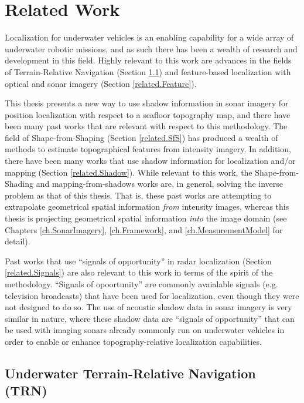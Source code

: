 
\chapter{Related Work}
\label{ch.RelatedWork}

Localization for underwater vehicles is an enabling capability for a wide array of underwater robotic missions, and as such there has been a wealth of research and development in this field.
Highly relevant to this work are advances in the fields of Terrain-Relative Navigation (Section \ref{related.TRN}) and feature-based localization with optical and sonar imagery (Section \ref{related.Feature}).

This thesis presents a new way to use shadow information in sonar imagery for position localization with respect to a seafloor topography map, and there have been many past works that are relevant with respect to this methodology.
The field of Shape-from-Shaping (Section \ref{related.SfS}) has produced a wealth of methods to estimate topographical features from intensity imagery.
In addition, there have been many works that use shadow information for localization and/or mapping (Section \ref{related.Shadow}).
While relevant to this work, the Shape-from-Shading and mapping-from-shadows works are, in general, solving the inverse problem as that of this thesis.
That is, these past works are attempting to extrapolate geometrical spatial information \emph{from} intensity images, whereas this thesis is projecting geometrical spatial information \emph{into} the image domain (see Chapters \ref{ch.SonarImagery}, \ref{ch.Framework}, and \ref{ch.MeasurementModel} for detail).

Past works that use ``signals of opportunity'' in radar localization (Section \ref{related.Signals}) are also relevant to this work in terms of the spirit of the methodology.
``Signals of opoortunity'' are commonly avaialable signals (e.g. television broadcasts) that have been used for localization, even though they were not designed to do so.
The use of acoustic shadow data in sonar imagery is very similar in nature, where these shadow data are ``signals of opportunity'' that can be used with imaging sonars already commonly run on underwater vehicles in order to enable or enhance topography-relative localization capabilities.


\section{Underwater Terrain-Relative Navigation (TRN)}
\label{related.TRN}

